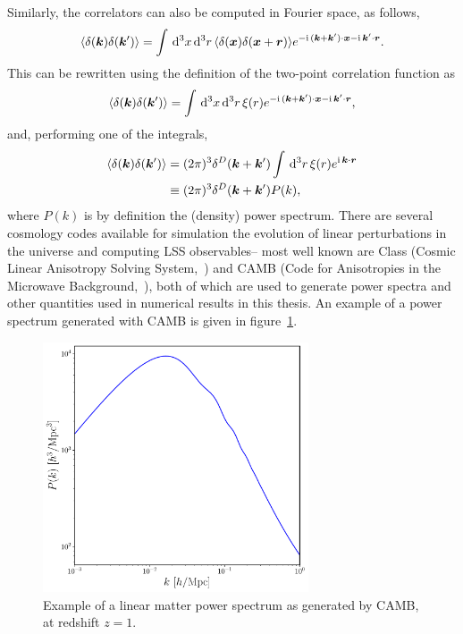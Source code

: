 Similarly, the correlators can also be computed in Fourier space, as follows, 
\begin{equation}
	\langle \delta(\bm {k}) \delta(\bm {k}') \rangle = \int \,\mathrm{d}^3 x \,\mathrm{d}^3 r \, \langle \delta(\bm {x}) \delta(\bm {x} + \bm{r})\rangle e^{-\mathrm{i\,} (\bm {k} + \bm {k}') \cdot \bm {x} - \mathrm{i\,} \bm {k}' \cdot \bm{r}}.
\end{equation}
This can be rewritten using the definition of the two-point correlation function as 
\begin{equation}
	\langle \delta(\bm {k}) \delta(\bm {k}') \rangle = \int \,\mathrm{d}^3 x \,\mathrm{d}^3 r \, \xi(r) e^{-\mathrm{i\,} (\bm {k} + \bm {k}') \cdot \bm {x} - \mathrm{i\,} \bm {k}' \cdot \bm{r}},
\end{equation}
and, performing one of the integrals, 
\begin{align}
	\langle \delta(\bm {k}) \delta(\bm {k}') \rangle &= (2\pi)^3 \delta^D(\bm {k} + \bm {k}') \int \,\mathrm{d}^3 r \,\xi(r) e^{\mathrm{i\,} \bm {k} \cdot \bm{r}} \\
	&\equiv (2\pi)^3 \delta^D(\bm {k} + \bm {k}') P(k),
\end{align}
where $P(k)$ is by definition the (density) power spectrum. There are several cosmology codes available for simulation the evolution of linear perturbations in the universe and computing LSS observables-- most well known are Class (Cosmic Linear Anisotropy Solving System,~\cite{Lesgourgues:2011}) and CAMB (Code for Anisotropies in the Microwave Background,~\cite{Lewis:1999bs}), both of which are used to generate power spectra and other quantities used in numerical results in this thesis. An example of a power spectrum generated with CAMB is given in figure~\ref{fig:powerspectrum}.
\begin{figure}[!ht]
	\centering
	\includegraphics[width=0.7\textwidth]{fig/matterpower_z1.pdf}
	\caption{Example of a linear matter power spectrum as generated by CAMB, at redshift $z=1$.}
	\label{fig:powerspectrum}
\end{figure}

